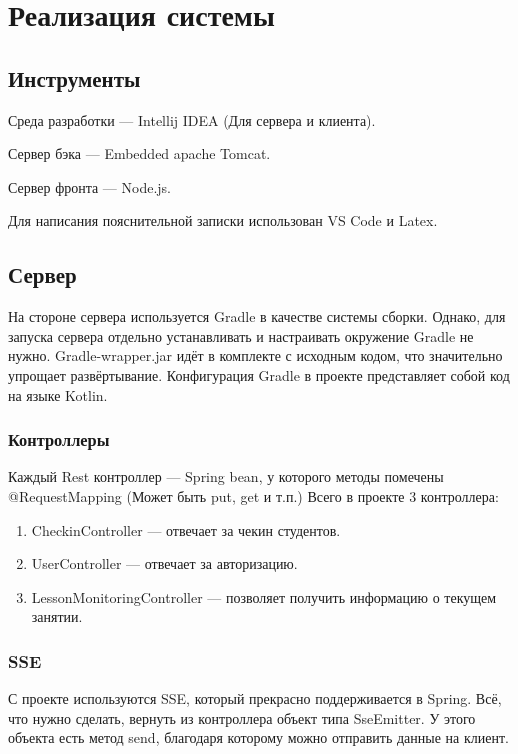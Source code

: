 \section{Реализация системы}\label{sec:devAlgoParallel}

\subsection{Инструменты}

Среда разработки --- Intellij IDEA (Для сервера и клиента).

Сервер бэка --- Embedded apache Tomcat.

Сервер фронта --- Node.js.

Для написания пояснительной записки использован VS Code и Latex.

\subsection{Сервер}

На стороне сервера используется Gradle в качестве системы сборки.
Однако, для запуска сервера отдельно устанавливать и настраивать окружение Gradle не нужно.
Gradle-wrapper.jar идёт в комплекте с исходным кодом, что значительно упрощает развёртывание.
Конфигурация Gradle в проекте представляет собой код на языке Kotlin.

\subsubsection{Контроллеры}

Каждый Rest контроллер --- Spring bean, у которого методы помечены @RequestMapping (Может быть put, get и т.п.)
Всего в проекте 3 контроллера:

\begin{enumerate}
    \item CheckinController --- отвечает за чекин студентов.
    \item UserController --- отвечает за авторизацию.
    \item LessonMonitoringController --- позволяет получить информацию о текущем занятии.
\end{enumerate}

\subsubsection{SSE}

С проекте используются SSE, который прекрасно поддерживается в Spring.
Всё, что нужно сделать, вернуть из контроллера объект типа SseEmitter.
У этого объекта есть метод send, благодаря которому можно отправить данные на клиент.

